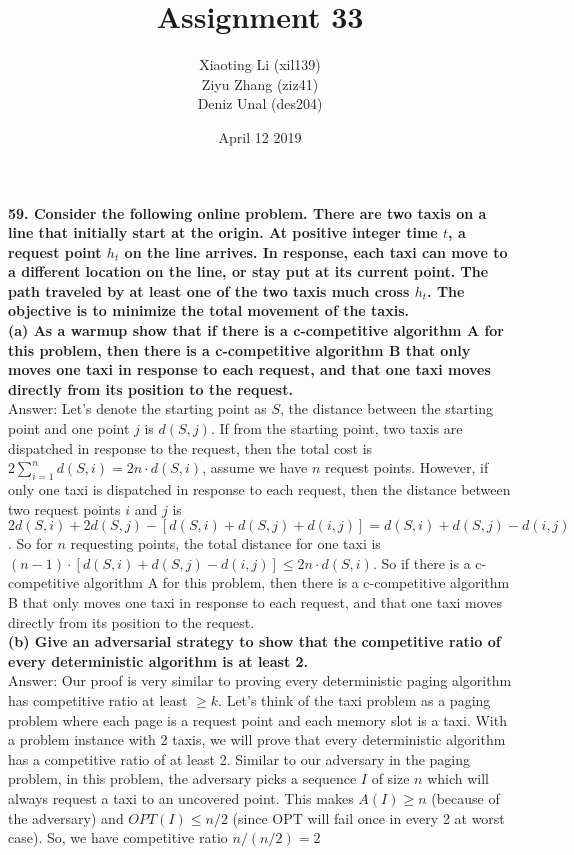 \documentclass{article}
\title{Assignment 33}
\author{Xiaoting Li (xil139) \\
Ziyu Zhang (ziz41) \\
Deniz Unal (des204)}
\date{April 12 2019}
\begin{document}
\maketitle

\noindent
\textbf{59. Consider the following online problem. There are two taxis on a line that initially start at the origin. At positive integer time $t$, a request point $h_t$ on the line arrives. In response, each taxi can move to a different location on the line, or stay put at its current point. The path traveled by at least one of the two taxis much cross $h_t$. The objective is to minimize the total movement of the taxis.} \\ \newline
\textbf{(a) As a warmup show that if there is a c-competitive algorithm A for this problem, then there is a c-competitive algorithm B that only moves one taxi in response to each request, and that one taxi moves directly from its position to the request.}\\ \newline
Answer: Let's denote the starting point as $S$, the distance between the starting point and one point $j$ is $d(S, j)$. If from the starting point, two taxis are dispatched in response to the request, then the total cost is $2\sum_{i=1}^n d(S, i) = 2n\cdot d(S, i)$, assume we have $n$ request points. However, if only one taxi is dispatched in response to each request, then the distance between two request points $i$ and $j$ is $2d(S, i) + 2d(S, j) - [d(S, i) + d(S, j) + d(i, j)] = d(S, i) + d(S, j) - d(i, j)$. So for $n$ requesting points, the total distance for one taxi is $(n-1)\cdot [d(S, i) + d(S, j) - d(i, j)] \leq 2n\cdot d(S, i)$. So if there is a c-competitive algorithm A for this problem, then there is a c-competitive algorithm B that only moves one taxi in response to each request, and that one taxi moves directly from its position to the request.\\ \newline
\textbf{(b) Give an adversarial strategy to show that the competitive ratio of every deterministic algorithm is at least 2.} \\ \newline
Answer: Our proof is very similar to proving every deterministic paging algorithm has competitive ratio at least $\geq k$. Let's think of the taxi problem as a paging problem where each page is a request point and each memory slot is a taxi. With a problem instance with 2 taxis, we will prove that every deterministic algorithm has a competitive ratio of at least 2. Similar to our adversary in the paging problem, in this problem, the adversary picks a sequence $I$ of size $n$ which will always request a taxi to an uncovered point. This makes $A(I) \geq n$ (because of the adversary) and $OPT(I) \leq n / 2$ (since OPT will fail once in every 2 at worst case). So, we have competitive ratio $n/(n / 2) = 2$ \\ \newline
\end{document}
